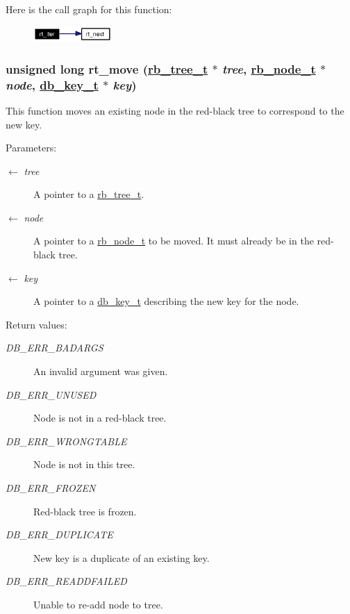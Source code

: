 Here is the call graph for this function:\begin{figure}[H]
\begin{center}
\leavevmode
\includegraphics[width=85pt]{group__dbprim__rbtree_ga11_cgraph}
\end{center}
\end{figure}
\hypertarget{group__dbprim__rbtree_ga7}{
\subsubsection[rt\_\-move]{\setlength{\rightskip}{0pt plus 5cm}unsigned long rt\_\-move (\hyperlink{struct__rb__tree__s}{rb\_\-tree\_\-t} $\ast$ {\em tree}, \hyperlink{struct__rb__node__s}{rb\_\-node\_\-t} $\ast$ {\em node}, \hyperlink{struct__db__key__s}{db\_\-key\_\-t} $\ast$ {\em key})}}
\label{group__dbprim__rbtree_ga7}


This function moves an existing node in the red-black tree to correspond to the new key.

\begin{Desc}
\item[Parameters:]
\begin{description}
\item[\mbox{$\leftarrow$} {\em tree}]A pointer to a \hyperlink{group__dbprim__rbtree_ga0}{rb\_\-tree\_\-t}. \item[\mbox{$\leftarrow$} {\em node}]A pointer to a \hyperlink{group__dbprim__rbtree_ga1}{rb\_\-node\_\-t} to be moved. It must already be in the red-black tree. \item[\mbox{$\leftarrow$} {\em key}]A pointer to a \hyperlink{group__dbprim_ga0}{db\_\-key\_\-t} describing the new key for the node.\end{description}
\end{Desc}
\begin{Desc}
\item[Return values:]
\begin{description}
\item[{\em DB\_\-ERR\_\-BADARGS}]An invalid argument was given. \item[{\em DB\_\-ERR\_\-UNUSED}]Node is not in a red-black tree. \item[{\em DB\_\-ERR\_\-WRONGTABLE}]Node is not in this tree. \item[{\em DB\_\-ERR\_\-FROZEN}]Red-black tree is frozen. \item[{\em DB\_\-ERR\_\-DUPLICATE}]New key is a duplicate of an existing key. \item[{\em DB\_\-ERR\_\-READDFAILED}]Unable to re-add node to tree.\end{description}
\end{Desc}


